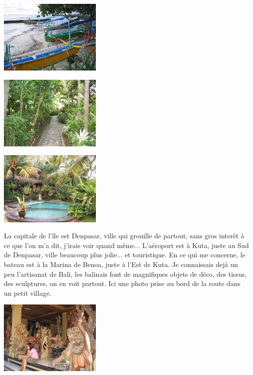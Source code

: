 \begin{multicols}{2}
\smallbreak
\hspace*{-0.65cm}
\includegraphics[width=5cm]{articles/Arrivee-sur-bali/1207567564x5vI.jpg}
\smallbreak

\smallbreak
\hspace*{-0.65cm}
\includegraphics[width=5cm]{articles/Arrivee-sur-bali/120756756426sq.jpg}
\smallbreak

\smallbreak
\hspace*{-0.65cm}
\includegraphics[width=5cm]{articles/Arrivee-sur-bali/1207567563njCA.jpg}
\smallbreak

La capitale de l'île est Denpasar, ville qui grouille de partout, sans gros interêt à ce que l'on m'a dit, j'irais voir quand même... L'aéroport est à Kuta, juste au Sud de Denpasar, ville beaucoup plus jolie... et touristique. En ce qui me concerne, le bateau est à la Marina de Benoa, juste à l'Est de Kuta. Je connaissais dejà un peu l'artisanat de Bali, les balinais font de magnifiques objets de déco, des tissus, des sculptures, on en voit partout. Ici une photo prise au bord de la route dans un petit village.

\smallbreak
\hspace*{-0.65cm}
\includegraphics[width=5cm]{articles/Arrivee-sur-bali/1207567562ISpn.jpg}
\smallbreak


\end{multicols}
